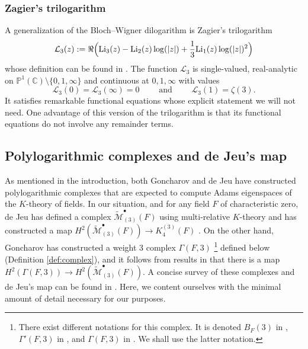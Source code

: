 \documentclass[11pt,a4,leqno]{amsart}
\theoremstyle{my theoremstyle}
\theoremstyle{dfn}
\theoremstyle{remark}
\renewcommand{\1}{\mathbbm{1}}
\newcommand{\C}{\mathbb{C}}
\numberwithin{equation}{section}
\begin{document}
\subsubsection{Zagier's trilogarithm}
A generalization of the Bloch--Wigner dilogarithm is Zagier's trilogarithm \cite{Zagier}
\begin{equation}\label{GonchL3}
\mathcal{L}_3(z):=\Re\Bigl(\mathrm{Li}_3(z)-\mathrm{Li}_2(z)\log(\vert z\vert)+\frac{1}{3}\mathrm{Li}_1(z)\log(\vert z\vert)^2\Bigr)
\end{equation}
whose definition can be found in \cite[(1.3)]{Goncharov}. The function $\mathcal{L}_3$ is single-valued, real-analytic on $\mathbb{P}^1(\C)\setminus \{ 0,1,\infty \}$ and continuous at $0,1,\infty$ with values 
\[
\mathcal{L}_3(0)=\mathcal{L}_3(\infty)=0 \qquad \text{ and } \qquad \mathcal{L}_3(1)=\zeta(3).
\]
It satisfies remarkable functional equations \cite[Theorem 1.3]{Goncharov} whose explicit statement we will not need. One advantage of this version of the trilogarithm is that its functional equations do not involve any remainder terms. 

\subsection{Polylogarithmic complexes and de Jeu's map}\label{s:compl}

As mentioned in the introduction, both Goncharov \cite{Goncharov} and de Jeu \cite{Jeu95,Jeu96} have constructed polylogarithmic complexes that are expected to compute Adams eigenspaces of the $K$-theory of fields. In our situation, and for any field $F$ of characteristic zero, de Jeu has defined a complex $\widetilde{\mathcal{M}}_{(3)}^{\bullet} (F)$ using multi-relative $K$-theory and has constructed a map $H^2(\widetilde{\mathcal{M}}_{(3)}^{\bullet} (F)) \to K_4^{(3)}(F)$ \cite{Jeu95}. On the other hand, Goncharov \cite{Goncharov} has constructed a weight $3$ complex $\Gamma(F,3)$ \footnote{There exist different notations for this complex. It is denoted $B_F(3)$ in \cite[p. 219]{Goncharov}, $\Gamma'(F,3)$ in \cite{Jeu00}, and $\Gamma(F,3)$ in \cite{Bru20}. We shall use the latter notation.} defined below (Definition \ref{def:complex}), and it follows from results in \cite[Section 5]{Jeu00} that there is a map $H^2(\Gamma(F,3))\to H^2(\widetilde{\mathcal{M}}_{(3)}^{\bullet} (F))$.
A concise survey of these complexes and de Jeu's map can be found in \cite[Section 4]{Bru20}. Here, we content ourselves with the minimal amount of detail necessary for our purposes. 
\end{document}
